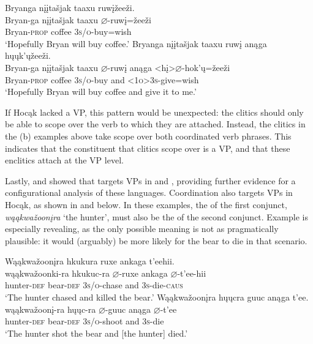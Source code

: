 \documentclass[output=paper]{LSP/langsci}
\begin{document}
\ea\label{ex:jrs:34}	
\ea
\glll Bryanga 			{n\k{i}\k{i}ta\v{s}jak taaxu }	ruw\k{i}\v{z}ee\v{z}i. \\
Bryan-ga 		{n\k{i}\k{i}ta\v{s}jak 	taaxu }	$\varnothing$-ruw\k{i}=\v{z}ee\v{z}i \\
	Bryan-\textsc{prop} 	coffee	\textsc{3s/o}-buy=wish \\
\trans `Hopefully Bryan will buy coffee.' 
\ex
\glll Bryanga 	{n\k{i}\k{i}ta\v{s}jak taaxu }	ruw\k{i} 		anąga 	h\k{u}\k{u}k'\k{u}\v{z}ee\v{z}i. \\
Bryan-ga 	{n\k{i}\k{i}ta\v{s}jak taaxu }	$\varnothing$-ruw\k{i}  	anąga 	<h\k{i}>$\varnothing$-hok'\k{u}=\v{z}ee\v{z}i \\
	Bryan-\textsc{prop} 	coffee 		\textsc{3s/o}-buy		 and 		\textsc{<1o>3s}-give=wish \\
\trans `Hopefully Bryan will buy coffee and give it to me.'
\z
\z
 
If Hocąk lacked a VP, this pattern would be unexpected: the clitics should only be able to scope over the verb to which they are attached. Instead, the clitics in the (b) examples above take scope over both coordinated verb phrases. This indicates that the constituent that clitics scope over is a VP, and that these enclitics attach at the VP level. 
	
Lastly, \citet{Boyle2007} and \citet{West2003} showed that  targets VPs in  and , providing further evidence for a configurational analysis of these languages.  Coordination also targets VPs in Hocąk, as shown in  and  below. In these examples, the  of the first conjunct, \textit{wąąkwa\v{z}oon\k{i}ra} `the hunter', must also be the  of the second conjunct.  Example  is especially revealing, as the only possible meaning is not as pragmatically plausible: it would (arguably) be more likely for the bear to die in that scenario.
 

\begin{exe}
\ex\label{ex:jrs:35} 
\glll Wąąkwa\v{z}oon\k{i}ra 		hk{u}k{u}ra 			ruxe 				ank{a}ga 	t'eehii. \\
wąąkwa\v{z}oonk{i}-ra 	hk{u}k{u}c-ra 		$\varnothing$-ruxe  		ank{a}ga 	$\varnothing$-t'ee-hii \\
hunter-\textsc{def} 					bear-\textsc{def} 	\textsc{3s/o}-chase and 		\textsc{3s}-die-\textsc{caus} \\
\trans`The hunter chased and killed the bear.'
  \ex\label{ex:jrs:36} 
\glll Wąąkwa\v{z}oon\k{i}ra 		h\k{u}\k{u}cra 		guuc 				anąga 	t'ee. \\
wąąkwa\v{z}oon\k{i}-ra 	h\k{u}\k{u}c-ra 		$\varnothing$-guuc 			anąga 	$\varnothing$-t'ee \\
hunter-\textsc{def} 		bear-\textsc{def} 	\textsc{3s/o}-shoot 		and 		\textsc{3s}-die \\
\trans `The hunter shot the bear and [the hunter] died.'
\end{exe}
	
\end{document}
